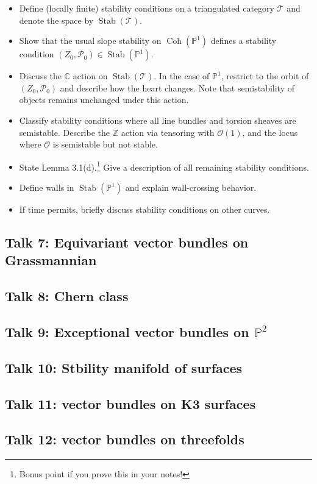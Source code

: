 \documentclass[UTF8]{amsart}
\numberwithin{equation}{section}
\theoremstyle{plain}
\numberwithin{equation}{section}
\theoremstyle{remark}
\DeclareMathOperator{\Coh}{\operatorname{Coh}}
\DeclareMathOperator{\Stab}{\operatorname{Stab}}
\begin{document}
\begin{itemize}
\item Define (locally finite) stability conditions on a triangulated category $\mathcal{T}$ and denote the space by $\Stab(\mathcal{T})$.
\item Show that the usual slope stability on $\Coh(\mathbb{P}^1)$ defines a stability condition $(Z_0, \mathcal{P}_0) \in \Stab(\mathbb{P}^1)$.
\item Discuss the $\mathbb{C}$ action on $\Stab(\mathcal{T})$. In the case of $\mathbb{P}^1$, restrict to the orbit of $(Z_0, \mathcal{P}_0)$ and describe how the heart changes. Note that semistability of objects remains unchanged under this action.
\item Classify stability conditions where all line bundles and torsion sheaves are semistable. Describe the $\mathbb{Z}$ action via tensoring with $\mathcal{O}(1)$, and the locus where $\mathcal{O}$ is semistable but not stable.
\item State Lemma 3.1(d).\footnote{Bonus point if you prove this in your notes!} Give a description of all remaining stability conditions.
\item Define walls in $\Stab(\mathbb{P}^1)$ and explain wall-crossing behavior.
\item If time permits, briefly discuss stability conditions on other curves.
\end{itemize}

\subsection*{Talk 7: Equivariant vector bundles on Grassmannian}

\subsection*{Talk 8: Chern class}

\subsection*{Talk 9: Exceptional vector bundles on $\mathbb{P}^2$}

\subsection*{Talk 10: Stbility manifold of surfaces}

\subsection*{Talk 11: vector bundles on K3 surfaces}

\subsection*{Talk 12: vector bundles on threefolds}



\end{document}
